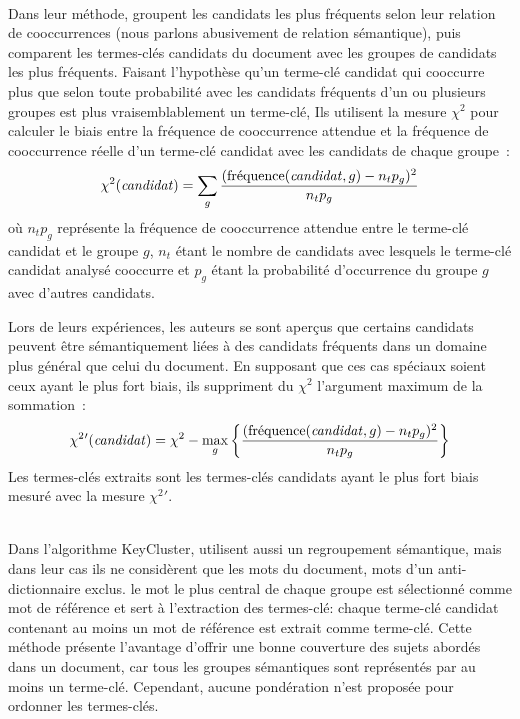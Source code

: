         ~\\Dans leur méthode,  groupent les
        candidats les plus fréquents selon leur relation de cooccurrences (nous
        parlons abusivement de relation sémantique), puis comparent les
        termes-clés candidats du document avec les groupes de candidats les plus
        fréquents. Faisant l'hypothèse qu'un terme-clé candidat qui cooccurre
        plus que selon toute probabilité avec les candidats fréquents d'un ou
        plusieurs groupes est plus vraisemblablement un terme-clé, Ils utilisent
        la mesure $\chi^2$ pour calculer le biais entre la fréquence de
        cooccurrence attendue et la fréquence de cooccurrence réelle d'un
        terme-clé candidat avec les candidats de chaque groupe~:
        \begin{align}
          \chi^2(\text{\textit{candidat}}) = \sum_{g} \frac{(\text{fréquence}(\text{\textit{candidat}}, g) - n_tp_g)^2}{n_tp_g}
        \end{align}
        où $n_tp_g$ représente la fréquence de cooccurrence attendue entre le
        terme-clé candidat et le groupe $g$, $n_t$ étant le nombre de candidats
        avec lesquels le terme-clé candidat analysé cooccurre et $p_g$ étant la
        probabilité d'occurrence du groupe $g$ avec d'autres candidats.
        
        Lors de leurs expériences, les auteurs se sont aperçus que certains
        candidats peuvent être sémantiquement liées à des candidats fréquents
        dans un domaine plus général que celui du document. En supposant que ces
        cas spéciaux soient ceux ayant le plus fort biais, ils suppriment du
        $\chi^2$ l'argument maximum de la sommation~:
        \begin{align}
          \chi^2{'}(\text{\textit{candidat}}) = \chi^2 - \max_{g}\left\{\frac{(\text{fréquence}(\text{\textit{candidat}}, g) - n_tp_g)^2}{n_tp_g}\right\}
        \end{align}
        Les termes-clés extraits sont les termes-clés candidats ayant le plus
        fort biais mesuré avec la mesure $\chi^2{'}$.

        ~\\Dans l'algorithme KeyCluster,  utilisent
        aussi un regroupement sémantique, mais dans leur cas ils ne considèrent
        que les mots du document, mots d'un anti-dictionnaire exclus. le mot le
        plus central de chaque groupe est sélectionné comme mot de référence et
        sert à l'extraction des termes-clé: chaque terme-clé candidat contenant
        au moins un mot de référence est extrait comme terme-clé. Cette méthode
        présente l'avantage d'offrir une bonne couverture des sujets abordés
        dans un document, car tous les groupes sémantiques sont représentés par
        au moins un terme-clé. Cependant, aucune pondération n'est proposée pour
        ordonner les termes-clés.

